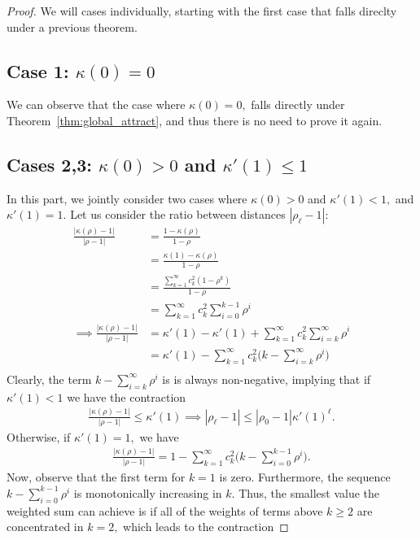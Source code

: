 \documentclass[twoside]{article}
\theoremstyle{definition}
\begin{document}
\begin{proof}
We will cases individually, starting with the first case that falls direclty under a previous theorem. 

\subsection*{Case 1: $\kappa(0)=0$}
We can observe that the case where $\kappa(0)=0,$ falls directly under Theorem~\ref{thm:global_attract}, and thus there is no need to prove it again.

\subsection*{Cases 2,3: $\kappa(0)>0$ and $\kappa'(1)\le 1$} In this part, we jointly consider two cases where $\kappa(0)>0$ and $\kappa'(1) < 1,$ and $\kappa'(1)=1.$ Let us consider the ratio between distances $|\rho_\ell-1|$:
\begin{align*}
    \frac{|\kappa(\rho)-1|}{|\rho-1|} &= \frac{1-\kappa(\rho)}{1-\rho} \\
    &=\frac{\kappa(1)-\kappa(\rho)}{1-\rho}\\
    &=\frac{\sum_{k=1}^\infty c_k^2 (1-\rho^k)}{1-\rho}\\
    &=\sum_{k=1}^\infty c_k^2 \sum_{i=0}^{k-1}\rho^i\\
\implies \frac{|\kappa(\rho)-1|}{|\rho-1|} &=\kappa'(1)-\kappa'(1)+\sum_{k=1}^\infty c_k^2 \sum_{i=k}^\infty \rho^i\\
&= \kappa'(1)-\sum_{k=1}^\infty c_k^2 \big(k-\sum_{i=k}^\infty \rho^i\big)\\
\end{align*}
Clearly, the term $k-\sum_{i=k}^\infty \rho^i$ is is always non-negative, implying that if $\kappa'(1)<1$ we have the contraction 
\begin{align*}
    \frac{|\kappa(\rho)-1|}{|\rho-1|} \le \kappa'(1) \implies |\rho_\ell-1| \le |\rho_0-1| \kappa'(1)^\ell.
\end{align*}
Otherwise, if $\kappa'(1)=1,$ we have 
\begin{align*}
    \frac{|\kappa(\rho)-1|}{|\rho-1|} = 1-\sum_{k=1}^\infty c_k^2 \big(k-\sum_{i=0}^{k-1} \rho^i\big).
\end{align*}
Now, observe that the first term for $k=1$ is zero. Furthermore, the sequence $k-\sum_{i=0}^{k-1}\rho^i$ is monotonically increasing in $k$. Thus, the smallest value the weighted sum can achieve is if all of the weights of terms above $k\ge 2$ are concentrated in $k=2,$ which leads to the contraction

\end{proof}
\end{document}
